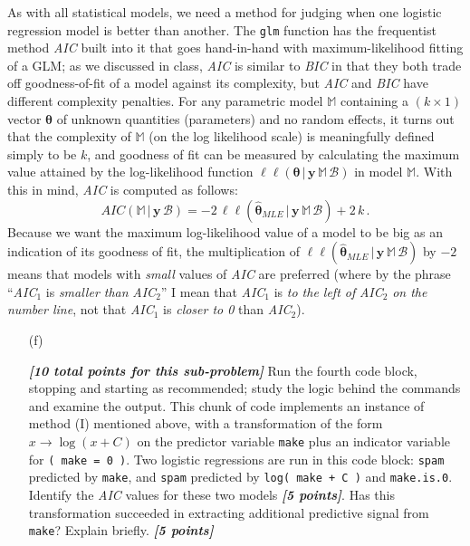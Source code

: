 \documentclass[12pt]{article}
\newcommand{\given}{\, | \,}
\newcommand{\bi}[1]{\textbf{\textit{#1}}}
\begin{document}
As with all statistical models, we need a method for judging when one logistic regression model is better than another. The \texttt{glm} function has the frequentist method \textit{AIC} built into it that goes hand-in-hand with maximum-likelihood fitting of a GLM; as we discussed in class, \textit{AIC} is similar to \textit{BIC} in that they both trade off goodness-of-fit of a model against its complexity, but \textit{AIC} and \textit{BIC} have different complexity penalties. For any parametric model $\mathbb{ M }$ containing a $( k \times 1 )$ vector $\bm{ \theta }$ of unknown quantities (parameters) and no random effects, it turns out that the complexity of $\mathbb{ M }$ (on the log likelihood scale) is meaningfully defined simply to be $k$, and goodness of fit can be measured by calculating the maximum value attained by the log-likelihood function $\ell \ell ( \bm{ \theta } \given \bm{ y } \, \mathbb{ M } \, \mathcal{ B } )$ in model $\mathbb{ M }$. With this in mind, \textit{AIC} is computed as follows:
\begin{equation} \label{e:aic}
AIC ( \mathbb{ M } \given \bm{ y } \, \mathcal{ B } ) = - 2 \, \ell \ell ( \hat{ \bm{ \theta } }_{ MLE } \given \bm{ y } \, \mathbb{ M } \, \mathcal{ B } ) + 2 \, k \, . 
\end{equation}
Because we want the maximum log-likelihood value of a model to be big as an indication of its goodness of fit, the multiplication of $\ell \ell ( \hat{ \bm{ \theta } }_{ MLE } \given \bm{ y } \, \mathbb{ M } \, \mathcal{ B } )$ by $- 2$ means that models with \textit{small} values of \textit{AIC} are preferred (where by the phrase ``\textit{AIC}$_1$ is \textit{smaller than} \textit{AIC}$_2$'' I mean that \textit{AIC}$_1$ is \textit{to the left of} \textit{AIC}$_2$ \textit{on the number line}, not that \textit{AIC}$_1$ is \textit{closer to 0} than \textit{AIC}$_2$).

\begin{itemize}

\item[(f)]

\bi{[10 total points for this sub-problem]} Run the fourth code block, stopping and starting as recommended; study the logic behind the commands and examine the output. This chunk of code implements an instance of method (I) mentioned above, with a transformation of the form $x \rightarrow \log ( x + C )$ on the predictor variable \texttt{make} plus an indicator variable for \texttt{( make = 0 )}. Two logistic regressions are run in this code block: \texttt{spam} predicted by \texttt{make}, and \texttt{spam} predicted by \texttt{log( make + C )} and \texttt{make.is.0}. Identify the \textit{AIC} values for these two models \bi{[5 points]}. Has this transformation succeeded in extracting additional predictive signal from \texttt{make}? Explain briefly. \bi{[5 points]}

\end{itemize}
\end{document}
